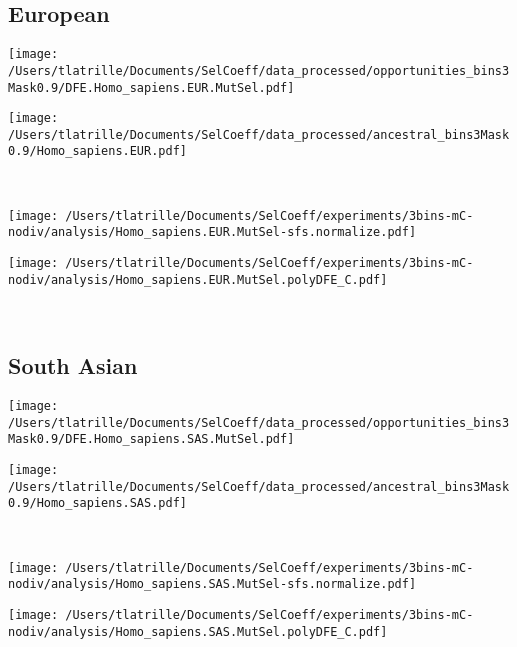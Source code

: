 \documentclass{article}
\begin{document}
    \subsection{European}

    \begin{minipage}{0.49\linewidth}
        \texttt{[image: /Users/tlatrille/Documents/SelCoeff/data\_processed/opportunities\_bins3Mask0.9/DFE.Homo\_sapiens.EUR.MutSel.pdf]}
    \end{minipage}
    \begin{minipage}{0.49\linewidth}
        \texttt{[image: /Users/tlatrille/Documents/SelCoeff/data\_processed/ancestral\_bins3Mask0.9/Homo\_sapiens.EUR.pdf]}
    \end{minipage}
    \\
    \begin{minipage}{0.49\linewidth}
        \texttt{[image: /Users/tlatrille/Documents/SelCoeff/experiments/3bins-mC-nodiv/analysis/Homo\_sapiens.EUR.MutSel-sfs.normalize.pdf]}
    \end{minipage}
    \begin{minipage}{0.49\linewidth}
        \texttt{[image: /Users/tlatrille/Documents/SelCoeff/experiments/3bins-mC-nodiv/analysis/Homo\_sapiens.EUR.MutSel.polyDFE\_C.pdf]}
    \end{minipage}
    \\
    \subsection{South Asian}

    \begin{minipage}{0.49\linewidth}
        \texttt{[image: /Users/tlatrille/Documents/SelCoeff/data\_processed/opportunities\_bins3Mask0.9/DFE.Homo\_sapiens.SAS.MutSel.pdf]}
    \end{minipage}
    \begin{minipage}{0.49\linewidth}
        \texttt{[image: /Users/tlatrille/Documents/SelCoeff/data\_processed/ancestral\_bins3Mask0.9/Homo\_sapiens.SAS.pdf]}
    \end{minipage}
    \\
    \begin{minipage}{0.49\linewidth}
        \texttt{[image: /Users/tlatrille/Documents/SelCoeff/experiments/3bins-mC-nodiv/analysis/Homo\_sapiens.SAS.MutSel-sfs.normalize.pdf]}
    \end{minipage}
    \begin{minipage}{0.49\linewidth}
        \texttt{[image: /Users/tlatrille/Documents/SelCoeff/experiments/3bins-mC-nodiv/analysis/Homo\_sapiens.SAS.MutSel.polyDFE\_C.pdf]}
    \end{minipage}
    \\
\end{document}
